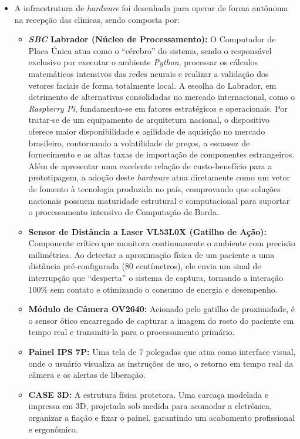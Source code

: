 \begin{itemize}
    \item A infraestrutura de \textit{hardware} foi desenhada para operar de forma autônoma na recepção das clínicas, sendo composta por:

    \begin{itemize}
        \item \textbf{\textit{SBC} Labrador (Núcleo de Processamento):} O Computador de Placa Única atua como o ``cérebro'' do sistema, sendo o responsável exclusivo por executar o ambiente \textit{Python}, processar os cálculos matemáticos intensivos das redes neurais e realizar a validação dos vetores faciais de forma totalmente local. A escolha do Labrador, em detrimento de alternativas consolidadas no mercado internacional, como o \textit{Raspberry Pi}, fundamenta-se em fatores estratégicos e operacionais. Por tratar-se de um equipamento de arquitetura nacional, o dispositivo oferece maior disponibilidade e agilidade de aquisição no mercado brasileiro, contornando a volatilidade de preços, a escassez de fornecimento e as altas taxas de importação de componentes estrangeiros. Além de apresentar uma excelente relação de custo-benefício para a prototipagem, a adoção deste \textit{hardware} atua diretamente como um vetor de fomento à tecnologia produzida no país, comprovando que soluções nacionais possuem maturidade estrutural e computacional para suportar o processamento intensivo de Computação de Borda.
        \item \textbf{Sensor de Distância a Laser VL53L0X (Gatilho de Ação):} Componente crítico que monitora continuamente o ambiente com precisão milimétrica. Ao detectar a aproximação física de um paciente a uma distância pré-configurada (80 centímetros), ele envia um sinal de interrupção que ``desperta'' o sistema de captura, tornando a interação 100\% sem contato e otimizando o consumo de energia e desempenho.
        \item \textbf{Módulo de Câmera OV2640:} Acionado pelo gatilho de proximidade, é o sensor ótico encarregado de capturar a imagem do rosto do paciente em tempo real e transmiti-la para o processamento primário.
        \item \textbf{Painel IPS 7P:} Uma tela de 7 polegadas que atua como interface visual, onde o usuário visualiza as instruções de uso, o retorno em tempo real da câmera e os alertas de liberação.
        \item \textbf{CASE 3D:} A estrutura física protetora. Uma carcaça modelada e impressa em 3D, projetada sob medida para acomodar a eletrônica, organizar a fiação e fixar o painel, garantindo um acabamento profissional e ergonômico.


\end{itemize}
\end{itemize}
